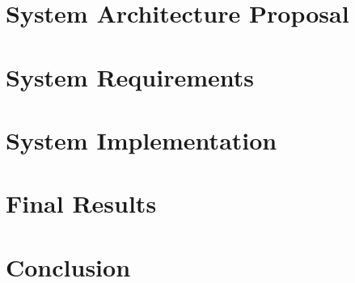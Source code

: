 \documentclass[
  oneside,
  11pt, a4paper,
  footinclude=true,
  headinclude=true,
  cleardoublepage=empty
]{scrbook}
\begin{document}
	\chapter{System Architecture Proposal}
	

	\chapter{System Requirements}
	

	\chapter{System Implementation}
	

	\chapter{Final Results}
	

	\chapter{Conclusion}
	

	\cleardoublepage

	
\end{document}
